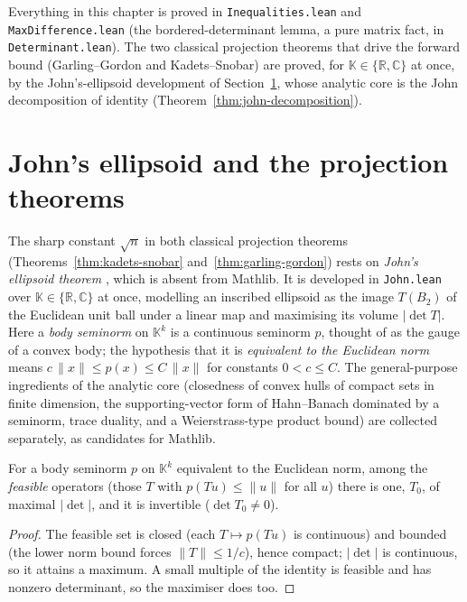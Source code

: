 Everything in this chapter is proved in \texttt{Inequalities.lean}
and \texttt{MaxDifference.lean} (the bordered-determinant lemma, a pure matrix
fact, in \texttt{Determinant.lean}). The two classical projection theorems
that drive the forward bound (Garling--Gordon and Kadets--Snobar) are proved,
for $\mathbb{K} \in \{\mathbb{R}, \mathbb{C}\}$ at once, by the
John's-ellipsoid development of Section~\ref{sec:john-ellipsoid}, whose
analytic core is the John decomposition of identity
(Theorem~\ref{thm:john-decomposition}).

\section{John's ellipsoid and the projection theorems}
\label{sec:john-ellipsoid}

The sharp constant $\sqrt{n}$ in both classical projection theorems
(Theorems~\ref{thm:kadets-snobar} and~\ref{thm:garling-gordon}) rests
on \emph{John's ellipsoid theorem} \cite{John48}, which is absent from Mathlib. It is developed
in \texttt{John.lean} over $\mathbb{K} \in \{\mathbb{R},
\mathbb{C}\}$ at once, modelling an inscribed ellipsoid as the image $T(B_2)$
of the Euclidean unit ball under a linear map and maximising its volume
$|\det T|$. Here a \emph{body seminorm} on $\mathbb{K}^k$ is a continuous
seminorm $p$, thought of as the gauge of a convex body; the hypothesis that it
is \emph{equivalent to the Euclidean norm} means
$c\,\|x\| \le p(x) \le C\,\|x\|$ for constants $0 < c \le C$.
The general-purpose ingredients of the analytic core
(closedness of convex hulls of compact sets in finite dimension, the
supporting-vector form of Hahn--Banach dominated by a seminorm, trace duality,
and a Weierstrass-type product bound) are collected separately, as candidates
for Mathlib.

\begin{theorem}
\label{thm:john-maxvolume}
\leanok
For a body seminorm $p$ on $\mathbb{K}^k$ equivalent to the Euclidean norm, among
the \emph{feasible} operators (those $T$ with $p(Tu) \le \|u\|$ for all $u$) there
is one, $T_0$, of maximal $|\det|$, and it is invertible ($\det T_0 \ne 0$).
\end{theorem}
\begin{proof}
\leanok
The feasible set is closed (each $T \mapsto p(Tu)$ is continuous) and bounded
(the lower norm bound forces $\|T\| \le 1/c$), hence compact; $|\det|$ is
continuous, so it attains a maximum. A small multiple of the identity is feasible
and has nonzero determinant, so the maximiser does too.
\end{proof}

